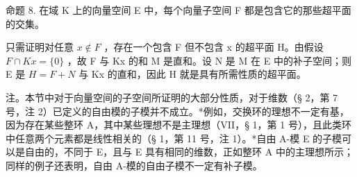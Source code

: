 命题 8. 在域 K 上的向量空间 E 中，每个向量子空间 F 都是包含它的那些超平面的交集。

只需证明对任意 \(x \notin F\) ，存在一个包含 F 但不包含 x 的超平面 H。由假设 \(F \cap Kx = \{0\}\) ，故 F 与 Kx 的和 M 是直和。设 N 是 M 在 E 中的补子空间；则 E 是 \(H = F + N\) 与 Kx 的直和，因此 H 就是具有所需性质的超平面。

注。本节中对于向量空间的子空间所证明的大部分性质，对于维数（§ 2，第 7 号，注 2）已定义的自由模的子模并不成立。*例如，交换环的理想不一定有基，因为存在某些整环 A，其中某些理想不是主理想（VII，§ 1，第 1 号），且此类环中任意两个元素都是线性相关的（§ 1，第 11 号，注 1）。*自由 A-模 E 的子模可以是自由的，不同于 E，且与 E 具有相同的维数，正如整环 A 中的主理想所示；同样的例子还表明，自由 A-模的自由子模不一定有补子模。

